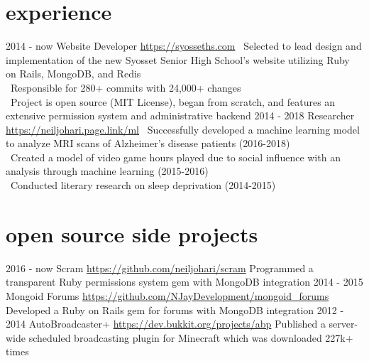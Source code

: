 \documentclass[]{friggeri-cv}
\begin{document}
\section{experience}
\begin{entrylist}
    \entry
    {2014 - now}
    {Website Developer}
    {\href{https://syosseths.com}{https://syosseths.com}}
    {\textendash \   Selected to lead design and implementation of the new Syosset Senior High School’s website utilizing Ruby on Rails, MongoDB, and Redis \\ 
     \textendash \   Responsible for 280+ commits with 24,000+ changes  \\
     \textendash \   Project is open source (MIT License), began from scratch, and features an extensive permission system and administrative backend}
    \entry
    {2014 - 2018}
    {Researcher}
    {\href{https://neiljohari.page.link/ml}{https://neiljohari.page.link/ml}}
    {\textendash \    Successfully developed a machine learning model to analyze MRI scans of Alzheimer’s disease patients (2016-2018) \\
     \textendash \    Created a model of video game hours played due to social influence with an analysis through machine learning (2015-2016) \\
     \textendash \    Conducted literary research on sleep deprivation (2014-2015)}
\end{entrylist} 

\section{open source side projects }
\begin{entrylist}
    \entry
    {2016 - now}
    {Scram}
    {\href{https://github.com/neiljohari/scram}{https://github.com/neiljohari/scram}}
    {Programmed a transparent Ruby permissions system gem with MongoDB integration}
    \entry
    {2014 - 2015}
    {Mongoid Forums}
    {\href{https://github.com/NJayDevelopment/mongoid_forums}{https://github.com/NJayDevelopment/mongoid\_forums}}
    {Developed a Ruby on Rails gem for forums with MongoDB integration}
    \entry
    {2012 - 2014}
    {AutoBroadcaster+}
    {\href{https://dev.bukkit.org/projects/abp}{https://dev.bukkit.org/projects/abp}}
    {Published a server-wide scheduled broadcasting plugin for Minecraft which was downloaded 227k+ times}

\end{entrylist}
\end{document}
